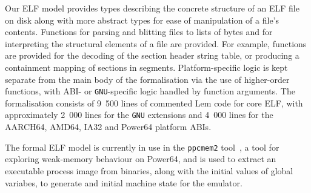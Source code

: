 


Our ELF model provides types describing the concrete structure of an ELF file on disk along with more abstract types for ease of manipulation of a file's contents.
Functions for parsing and blitting files to lists of bytes and for interpreting the structural elements of a file are provided.
For example, functions are provided for the decoding of the section header string table, or producing a containment mapping of sections in segments.
Platform-specific logic is kept separate from the main body of the formalisation via the use of higher-order functions, with ABI- or \texttt{GNU}-specific logic handled by function arguments.
The formalisation consists of 9~500 lines of commented Lem code for core ELF, with approximately 2~000 lines for the \texttt{GNU} extensions and 4~000 lines for the AARCH64, AMD64, IA32 and Power64 platform ABIs.

The formal ELF model is currently in use in the \texttt{ppcmem2} tool~\cite{gray-integrated-2015}, a tool for exploring weak-memory behaviour on Power64, and is used to extract an executable process image from binaries, along with the initial values of global variabes, to generate and initial machine state for the emulator.

